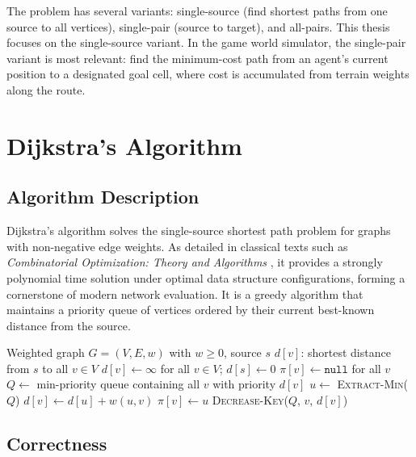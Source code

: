 \documentclass[12pt, a4paper, oneside]{report}
\theoremstyle{definition}
\begin{document}
The problem has several variants: single-source (find shortest paths from one source to all vertices), single-pair (source to target), and all-pairs. This thesis focuses on the single-source variant. In the game world simulator, the single-pair variant is most relevant: find the minimum-cost path from an agent's current position to a designated goal cell, where cost is accumulated from terrain weights along the route.

\section{Dijkstra's Algorithm}

\subsection{Algorithm Description}

Dijkstra's algorithm \citep{dijkstra1959} solves the single-source shortest path problem for graphs with non-negative edge weights. As detailed in classical texts such as \emph{Combinatorial Optimization: Theory and Algorithms} \citep{korte2018}, it provides a strongly polynomial time solution under optimal data structure configurations, forming a cornerstone of modern network evaluation. It is a greedy algorithm that maintains a priority queue of vertices ordered by their current best-known distance from the source.

\begin{algorithm}[H]
\caption{Dijkstra's Algorithm}
\label{alg:dijkstra}
\begin{algorithmic}[1]
\Require Weighted graph $G = (V, E, w)$ with $w \geq 0$, source $s$
\Ensure $d[v]$: shortest distance from $s$ to all $v \in V$
\State $d[v] \gets \infty$ for all $v \in V$; $d[s] \gets 0$
\State $\pi[v] \gets \texttt{null}$ for all $v$ 
\State $Q \gets$ min-priority queue containing all $v$ with priority $d[v]$
    \State $u \gets$ \textsc{Extract-Min}($Q$)
            \State $d[v] \gets d[u] + w(u,v)$
            \State $\pi[v] \gets u$
            \State \textsc{Decrease-Key}($Q$, $v$, $d[v]$)
        \EndIf
    \EndFor
\EndWhile
\end{algorithmic}
\end{algorithm}

\subsection{Correctness}
\end{document}
